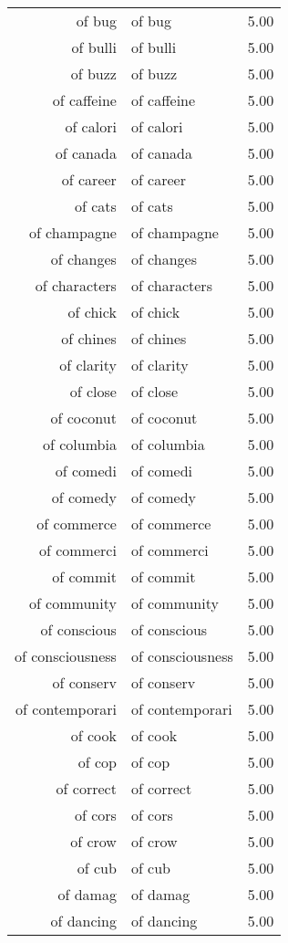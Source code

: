\begin{table}[ht]
\begin{tabular}{rlr}
  of bug & of bug & 5.00 \\ 
  of bulli & of bulli & 5.00 \\ 
  of buzz & of buzz & 5.00 \\ 
  of caffeine & of caffeine & 5.00 \\ 
  of calori & of calori & 5.00 \\ 
  of canada & of canada & 5.00 \\ 
  of career & of career & 5.00 \\ 
  of cats & of cats & 5.00 \\ 
  of champagne & of champagne & 5.00 \\ 
  of changes & of changes & 5.00 \\ 
  of characters & of characters & 5.00 \\ 
  of chick & of chick & 5.00 \\ 
  of chines & of chines & 5.00 \\ 
  of clarity & of clarity & 5.00 \\ 
  of close & of close & 5.00 \\ 
  of coconut & of coconut & 5.00 \\ 
  of columbia & of columbia & 5.00 \\ 
  of comedi & of comedi & 5.00 \\ 
  of comedy & of comedy & 5.00 \\ 
  of commerce & of commerce & 5.00 \\ 
  of commerci & of commerci & 5.00 \\ 
  of commit & of commit & 5.00 \\ 
  of community & of community & 5.00 \\ 
  of conscious & of conscious & 5.00 \\ 
  of consciousness & of consciousness & 5.00 \\ 
  of conserv & of conserv & 5.00 \\ 
  of contemporari & of contemporari & 5.00 \\ 
  of cook & of cook & 5.00 \\ 
  of cop & of cop & 5.00 \\ 
  of correct & of correct & 5.00 \\ 
  of cors & of cors & 5.00 \\ 
  of crow & of crow & 5.00 \\ 
  of cub & of cub & 5.00 \\ 
  of damag & of damag & 5.00 \\ 
  of dancing & of dancing & 5.00 \\ 

\end{tabular}
\end{table}
